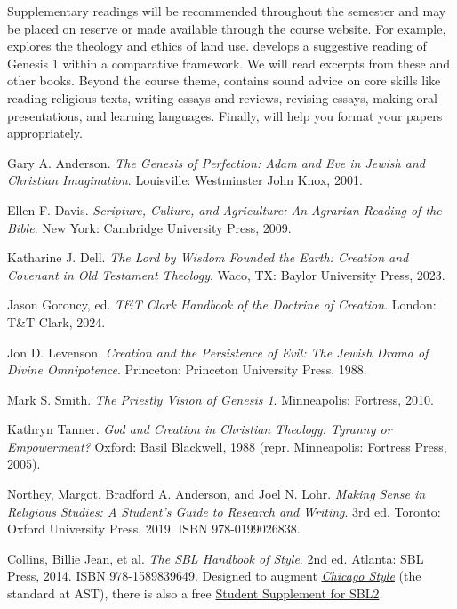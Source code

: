\documentclass[titlepage]{article}
\begin{document}
Supplementary readings will be recommended throughout the semester and
may be placed on reserve or made available through the course website.
For example, \cite{ed} explores the theology and ethics of land use.
\cite{ms} develops a suggestive reading of Genesis 1 within a
comparative framework. We will read excerpts from these and other books.
Beyond the course theme, \cite{rlgs} contains sound advice on core
skills like reading religious texts, writing essays and reviews,
revising essays, making oral presentations, and learning languages.
Finally, \cite{sbl2} will help you format your papers appropriately.

\begingroup
\renewcommand{\section}[2]{}%
\begin{thebibliography}{Making Sense}%

	 Gary A. Anderson.
	\emph{The Genesis of Perfection: Adam and Eve in Jewish and Christian Imagination}.
	Louisville: Westminster John Knox, 2001.

	 Ellen F. Davis.
	\emph{Scripture, Culture, and Agriculture: An Agrarian Reading of the Bible}.
	New York: Cambridge University Press, 2009.

	 Katharine J. Dell.
	\emph{The Lord by Wisdom Founded the Earth: Creation and Covenant in Old Testament Theology}.
	Waco, TX: Baylor University Press, 2023.

	 Jason Goroncy, ed.
	\emph{T\&T Clark Handbook of the Doctrine of Creation}.
	London: T\&T Clark, 2024.

	 Jon D. Levenson.
	\emph{Creation and the Persistence of Evil: The Jewish Drama of Divine Omnipotence}.
	Princeton: Princeton University Press, 1988. %

	 Mark S. Smith.
	\emph{The Priestly Vision of Genesis 1}.
	Minneapolis: Fortress, 2010.

	 Kathryn Tanner.
	\emph{God and Creation in Christian Theology: Tyranny or Empowerment?}
	Oxford: Basil Blackwell, 1988 (repr. Minneapolis: Fortress Press, 2005).

	 Northey, Margot, Bradford A. Anderson, and Joel N. Lohr.
	\emph{Making Sense in Religious Studies: A Student's Guide to Research and Writing}.
	3rd ed. Toronto: Oxford University Press, 2019. ISBN 978-0199026838.

	 Collins, Billie Jean, et al.
	\emph{The SBL Handbook of Style}.
	2nd ed. Atlanta: SBL Press, 2014. ISBN 978-1589839649.
	Designed to augment \href{http://www.chicagomanualofstyle.org/home.html}{\emph{Chicago Style}}
	(the standard at AST), there is also a free
	\href{https://www.sbl-site.org/assets/pdfs/pubs/SBLHSsupp2015-02.pdf}{Student Supplement for SBL2}.

\end{thebibliography}
\endgroup
\end{document}
